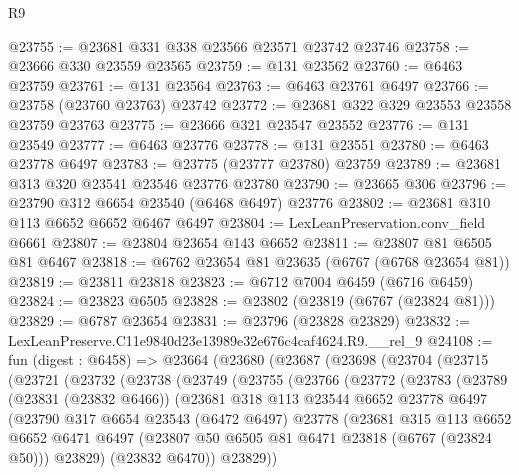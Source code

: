 \begin{lexlean}{R9}
\begin{coremodule}
@23755 := @23681 @331 @338 @23566 @23571 @23742 @23746
@23758 := @23666 @330 @23559 @23565
@23759 := @131 @23562
@23760 := @6463 @23759
@23761 := @131 @23564
@23763 := @6463 @23761 @6497
@23766 := @23758 (@23760 @23763) @23742
@23772 := @23681 @322 @329 @23553 @23558 @23759 @23763
@23775 := @23666 @321 @23547 @23552
@23776 := @131 @23549
@23777 := @6463 @23776
@23778 := @131 @23551
@23780 := @6463 @23778 @6497
@23783 := @23775 (@23777 @23780) @23759
@23789 := @23681 @313 @320 @23541 @23546 @23776 @23780
@23790 := @23665 @306
@23796 := @23790 @312 @6654 @23540 (@6468 @6497) @23776
@23802 := @23681 @310 @113 @6652 @6652 @6467 @6497
@23804 := LexLeanPreservation.conv_field @6661
@23807 := @23804 @23654 @143 @6652
@23811 := @23807 @81 @6505 @81 @6467
@23818 := @6762 @23654 @81 @23635 (@6767 (@6768 @23654 @81))
@23819 := @23811 @23818
@23823 := @6712 @7004 @6459 (@6716 @6459)
@23824 := @23823 @6505
@23828 := @23802 (@23819 (@6767 (@23824 @81)))
@23829 := @6787 @23654
@23831 := @23796 (@23828 @23829)
@23832 := LexLeanPreserve.C11e9840d23e13989e32e676c4caf4624.R9.__rel_9
@24108 := fun (digest : @6458) =>
  @23664
    (@23680
      (@23687
        (@23698
          (@23704
            (@23715
              (@23721
                (@23732
                  (@23738
                    (@23749
                      (@23755
                        (@23766
                          (@23772
                            (@23783
                              (@23789
                                (@23831 (@23832 @6466))
                                (@23681
                                  @318
                                  @113
                                  @23544
                                  @6652
                                  @23778
                                  @6497
                                  (@23790
                                    @317
                                    @6654
                                    @23543
                                    (@6472 @6497)
                                    @23778
                                    (@23681
                                      @315
                                      @113
                                      @6652
                                      @6652
                                      @6471
                                      @6497
                                      (@23807 @50 @6505 @81 @6471 @23818 (@6767 (@23824 @50)))
                                      @23829)
                                    (@23832 @6470))
                                  @23829))

\end{coremodule}
\end{lexlean}
